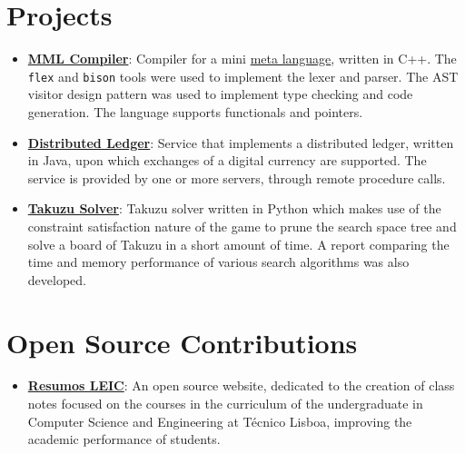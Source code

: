 \documentclass[letterpaper,11pt]{article}
\newcommand{\resumeItem}[2]{
  \item\small{
    \textbf{#1}{: #2 \vspace{-2pt}}
  }
}
\newcommand{\resumeSubItem}[2]{\resumeItem{#1}{#2}\vspace{-4pt}}
\newcommand{\resumeSubHeadingListStart}{\begin{itemize}[leftmargin=*]}
\newcommand{\resumeSubHeadingListEnd}{\end{itemize}}
\begin{document}
\section{Projects}
  \resumeSubHeadingListStart
    \resumeSubItem{\href{https://github.com/pedroclobo/mml-compiler}{MML Compiler}}
      {Compiler for a mini \href{https://en.wikipedia.org/wiki/ML_(programming_language)}{meta language}, written in C++. The \texttt{flex} and \texttt{bison} tools were used to implement the lexer and parser. The AST visitor design pattern was used to implement type checking and code generation. The language supports functionals and pointers.}
    \resumeSubItem{\href{https://github.com/pedroclobo/dist-ledger}{Distributed Ledger}}
      {Service that implements a distributed ledger, written in Java, upon which exchanges of a digital currency are supported. The service is provided by one or more servers, through remote procedure calls.}
    \resumeSubItem{\href{https://github.com/pedroclobo/takuzu}{Takuzu Solver}}
      {Takuzu solver written in Python which makes use of the constraint satisfaction nature of the game to prune the search space tree and solve a board of Takuzu in a short amount of time. A report comparing the time and memory performance of various search algorithms was also developed.}
  \resumeSubHeadingListEnd

\vspace{4pt}

\section{Open Source Contributions}
 \resumeSubHeadingListStart
  \resumeSubItem{\href{https://github.com/leic-pt/resumos-leic/pulls?q=author:pedroclobo}{Resumos LEIC}}
    {An open source website, dedicated to the creation of class notes focused on the courses in the curriculum of the undergraduate in Computer Science and Engineering at Técnico Lisboa, improving the academic performance of students.}
 \resumeSubHeadingListEnd
\end{document}
